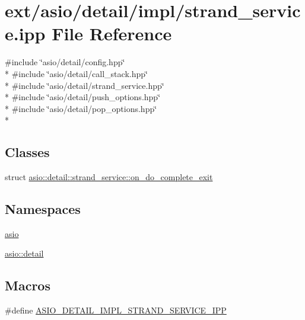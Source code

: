 \hypertarget{strand__service_8ipp}{}\section{ext/asio/detail/impl/strand\+\_\+service.ipp File Reference}
\label{strand__service_8ipp}
{\ttfamily \#include \char`\"{}asio/detail/config.\+hpp\char`\"{}}\\*
{\ttfamily \#include \char`\"{}asio/detail/call\+\_\+stack.\+hpp\char`\"{}}\\*
{\ttfamily \#include \char`\"{}asio/detail/strand\+\_\+service.\+hpp\char`\"{}}\\*
{\ttfamily \#include \char`\"{}asio/detail/push\+\_\+options.\+hpp\char`\"{}}\\*
{\ttfamily \#include \char`\"{}asio/detail/pop\+\_\+options.\+hpp\char`\"{}}\\*
\subsection*{Classes}
\begin{DoxyCompactItemize}
\item 
struct \hyperlink{structasio_1_1detail_1_1strand__service_1_1on__do__complete__exit}{asio\+::detail\+::strand\+\_\+service\+::on\+\_\+do\+\_\+complete\+\_\+exit}
\end{DoxyCompactItemize}
\subsection*{Namespaces}
\begin{DoxyCompactItemize}
\item 
 \hyperlink{namespaceasio}{asio}
\item 
 \hyperlink{namespaceasio_1_1detail}{asio\+::detail}
\end{DoxyCompactItemize}
\subsection*{Macros}
\begin{DoxyCompactItemize}
\item 
\#define \hyperlink{strand__service_8ipp_aee1efe04b16cd25d027b3b90b927b2e1}{A\+S\+I\+O\+\_\+\+D\+E\+T\+A\+I\+L\+\_\+\+I\+M\+P\+L\+\_\+\+S\+T\+R\+A\+N\+D\+\_\+\+S\+E\+R\+V\+I\+C\+E\+\_\+\+I\+P\+P}
\end{DoxyCompactItemize}


